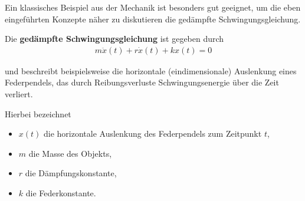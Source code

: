 \par
Ein klassisches Beispiel aus der Mechanik ist besonders gut geeignet, um die eben eingeführten Konzepte näher zu diskutieren   die gedämpfte Schwingungsgleichung.
\label{ode/fluesse:ex:oscillations}
\begin{example}{}{}



\par
Die \textbf{gedämpfte Schwingungsgleichung} ist gegeben durch
\begin{align}\label{equation:ode/fluesse:eq:schwingungsgleichung}
m\ddot{x}(t) + r\dot{x}(t) + kx(t)=0
\end{align}
\par
und beschreibt beispielsweise die horizontale (eindimensionale) Auslenkung eines Federpendels, das durch Reibungsverluste Schwingungsenergie über die Zeit verliert.

\par
Hierbei bezeichnet
\begin{itemize}
\item {} 
\par
\(x(t)\) die horizontale Auslenkung des Federpendels zum Zeitpunkt \(t\),

\item {} 
\par
\(m\) die Masse des Objekts,

\item {} 
\par
\(r\) die Dämpfungskonstante,

\item {} 
\par
\(k\) die Federkonstante.

\end{itemize}


\end{example}
